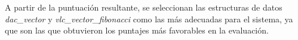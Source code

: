 







A partir de la puntuación resultante, se seleccionan las estructuras de datos \textit{dac\_vector} y \textit{vlc\_vector\_fibonacci} como las más adecuadas para el sistema, ya que son las que obtuvieron los puntajes más favorables en la evaluación.